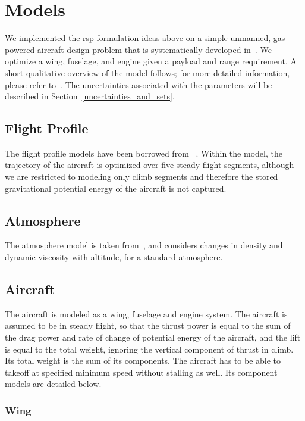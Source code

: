 \section{Models}

We implemented the \gls{rsp} formulation ideas above on a simple unmanned, gas-powered
aircraft design problem that is systematically developed in~\cite{Ozturk2018}.
We optimize a wing, fuselage, and engine given a payload and range requirement.
A short qualitative overview of the model follows; for
more detailed information, please refer to~\cite{Ozturk2018}. The uncertainties
associated with the parameters will be described in Section~\ref{uncertainties_and_sets}.

\subsection{Flight Profile}

The flight profile models have been borrowed from ~\cite{York2018}. Within the model, the
trajectory of the aircraft is optimized over five steady flight segments,
although we are restricted to modeling only climb segments
and therefore the stored gravitational potential energy of the aircraft is not captured.

\subsection{Atmosphere}

The atmosphere model is taken from~\cite{Tao2018}, and considers changes in density and dynamic
viscosity with altitude, for a standard atmosphere.

\subsection{Aircraft}

The aircraft is modeled as a wing, fuselage and engine system. The aircraft is assumed
to be in steady flight, so that the thrust power is equal to the sum of the drag power and rate of change
of potential energy of the aircraft, and the lift is equal to the total weight, ignoring the vertical component of
thrust in climb. Its total weight is the sum of its components.
The aircraft has to be able to takeoff at specified minimum speed without stalling as well.
Its component models are detailed below.

\subsubsection{Wing}

